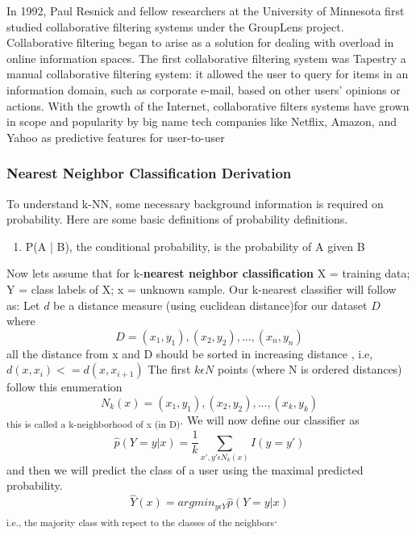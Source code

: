 \documentclass{report}
\begin{document}
In 1992, Paul Resnick and fellow researchers at the University of Minnesota first studied collaborative filtering systems under the GroupLens project\cite{2}.  Collaborative filtering began to arise as a solution for dealing with overload in online information spaces. The first collaborative filtering system was Tapestry
a manual collaborative filtering system: it allowed the user to query for
items in an information domain, such as corporate e-mail, based on
other users’ opinions or actions\cite{6}. With the growth of the Internet, collaborative filters systems have grown in scope and popularity by big name tech companies like Netflix, Amazon, and Yahoo as predictive features for user-to-user 

\subsubsection{Nearest Neighbor Classification Derivation}
To understand k-NN, some necessary background information is required on probability. Here are some basic definitions of probability definitions. \cite{4}
\begin{enumerate}
	\item P(A | B), the conditional probability, is the probability of A given B
\end{enumerate}
Now lets assume that for  k-\textbf{nearest neighbor classification }  X = training data; Y = class labels of X; x = unknown sample.
Our k-nearest classifier will follow as:
Let $d$ be a distance measure (using euclidean distance)for our dataset $D$ where
\begin{equation}
D = (x_{1}, y_{1}), (x_{2}, y_{2}), ... , (x_{n}, y_{n})
\end{equation}
all the distance from x and D should be sorted in increasing distance , i.e,
$d(x,x_{i}) <= d(x,x_{i+1})$ \newline
The first $k \epsilon N$ points (where N is ordered distances) follow this  enumeration 
\begin{equation}
N_{k}(x) = (x_{1}, y_{1}), (x_{2}, y_{2}), ... , (x_{k}, y_{k}) 
\end{equation} 
\textsubscript{this is called a k-neighborhood of x (in D)}. \newline\newline
We will now define our classifier as 
\begin{equation}
\hat{p}(Y = y | x) = \frac{1}{k} \sum_{x',y' \epsilon N_{k}(x) }  I(y = y')
\end{equation}
and then we will predict the class of a user using the maximal predicted probability.
\begin{equation}
\hat{Y}(x) = argmin_{y \epsilon Y} \hat{p}(Y = y |x)
\end{equation}
\textsubscript{i.e., the majority class with repect to the classes of the neighbors}. \newline\newline
\end{document}
